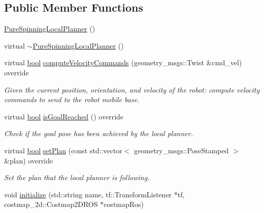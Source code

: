 \subsection*{Public Member Functions}
\begin{DoxyCompactItemize}
\item 
\hyperlink{classcl__move__base__z_1_1pure__spinning__local__planner_1_1PureSpinningLocalPlanner_a34d84f1feeade08ba99c209663a192fe}{Pure\+Spinning\+Local\+Planner} ()
\item 
virtual \hyperlink{classcl__move__base__z_1_1pure__spinning__local__planner_1_1PureSpinningLocalPlanner_a7b4b13645d8d0d93f341e8eafe64d855}{$\sim$\+Pure\+Spinning\+Local\+Planner} ()
\item 
virtual \hyperlink{classbool}{bool} \hyperlink{classcl__move__base__z_1_1pure__spinning__local__planner_1_1PureSpinningLocalPlanner_af7dfee89a0a6c54569b5fd262ccbd4f0}{compute\+Velocity\+Commands} (geometry\+\_\+msgs\+::\+Twist \&cmd\+\_\+vel) override
\begin{DoxyCompactList}\small\item\em Given the current position, orientation, and velocity of the robot\+: compute velocity commands to send to the robot mobile base. \end{DoxyCompactList}\item 
virtual \hyperlink{classbool}{bool} \hyperlink{classcl__move__base__z_1_1pure__spinning__local__planner_1_1PureSpinningLocalPlanner_ae97111281935628a23cfca3c65f5d8c7}{is\+Goal\+Reached} () override
\begin{DoxyCompactList}\small\item\em Check if the goal pose has been achieved by the local planner. \end{DoxyCompactList}\item 
virtual \hyperlink{classbool}{bool} \hyperlink{classcl__move__base__z_1_1pure__spinning__local__planner_1_1PureSpinningLocalPlanner_a86a2249c0132ae9f0dc666a67d5a1f9b}{set\+Plan} (const std\+::vector$<$ geometry\+\_\+msgs\+::\+Pose\+Stamped $>$ \&plan) override
\begin{DoxyCompactList}\small\item\em Set the plan that the local planner is following. \end{DoxyCompactList}\item 
void \hyperlink{classcl__move__base__z_1_1pure__spinning__local__planner_1_1PureSpinningLocalPlanner_afc2d05b55e4a68932bbf8b4aabe9e219}{initialize} (std\+::string name, tf\+::\+Transform\+Listener $\ast$tf, costmap\+\_\+2d\+::\+Costmap2\+D\+R\+OS $\ast$costmap\+Ros)

\end{DoxyCompactItemize}
